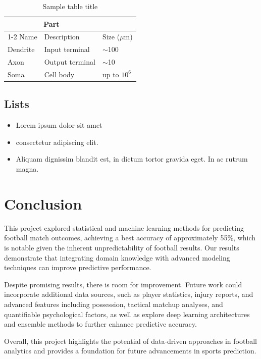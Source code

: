 \documentclass{article}
\begin{document}
\begin{table}
 \caption{Sample table title}
  \centering
  \begin{tabular}{lll}
    \toprule
    \multicolumn{2}{c}{Part}                   \\
    \cmidrule(r){1-2}
    Name     & Description     & Size ($\mu$m) \\
    \midrule
    Dendrite & Input terminal  & $\sim$100     \\
    Axon     & Output terminal & $\sim$10      \\
    Soma     & Cell body       & up to $10^6$  \\
    \bottomrule
  \end{tabular}
  \label{tab:table}
\end{table}

\subsection{Lists}
\begin{itemize}
\item Lorem ipsum dolor sit amet
\item consectetur adipiscing elit. 
\item Aliquam dignissim blandit est, in dictum tortor gravida eget. In ac rutrum magna.
\end{itemize}

\section{Conclusion}

This project explored statistical and machine learning methods for predicting football match outcomes, achieving a best accuracy of approximately 55\%, which is notable given the inherent unpredictability of football results. Our results demonstrate that integrating domain knowledge with advanced modeling techniques can improve predictive performance.

Despite promising results, there is room for improvement. Future work could incorporate additional data sources, such as player statistics, injury reports, and advanced features including possession, tactical matchup analyses, and quantifiable psychological factors, as well as explore deep learning architectures and ensemble methods to further enhance predictive accuracy.

Overall, this project highlights the potential of data-driven approaches in football analytics and provides a foundation for future advancements in sports prediction.
\end{document}
